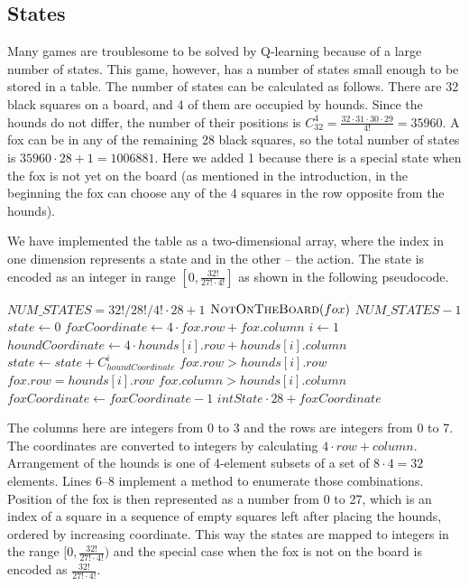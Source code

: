 \documentclass[a4paper]{article}
\begin{document}
\subsection{States} \label{states}
Many games are troublesome to be solved by Q-learning because of a large number
of states. This game, however, has a number of states small enough to be stored
in a table. The number of states can be calculated as follows. There are 32
black squares on a board, and 4 of them are occupied by hounds. Since the
hounds do not differ, the number of their positions is $C_{32}^4 = \frac{32
\cdot 31 \cdot 30 \cdot 29}{4!} = 35960$. A fox can be in any of the remaining
28 black squares, so the total number of states is $35960 \cdot 28 + 1 =
1006881$. Here we added 1 because there is a special state when the fox is not
yet on the board (as mentioned in the introduction, in the beginning the fox
can choose any of the 4 squares in the row opposite from the hounds).

We have implemented the table as a two-dimensional array, where the index in
one dimension represents a state and in the other -- the action. The state is
encoded as an integer in range $[0, \frac{32!}{27! \cdot 4!}]$ as shown in the
following pseudocode.

\begin{codebox}
    \li $NUM\_STATES = 32! / 28! / 4! \cdot 28 + 1$
    \li \If $\textnormal{\scshape NotOnTheBoard}(fox)$
    \li     \Then \Return $NUM\_STATES - 1$
        \End
    \li $state \gets 0$
    \li $foxCoordinate \gets 4 \cdot fox.row + fox.column$
    \li \For $i \gets 1$ 
    \li \Do $houndCoordinate \gets 4 \cdot hounds[i].row + hounds[i].column$
    \li     $state \gets state + C_{houndCoordinate}^i$
    \li     \If $fox.row > hounds[i].row$ 
    \li \>\> $fox.row = hounds[i].row$  $fox.column > hounds[i].column$
    \li         \Then $foxCoordinate \gets foxCoordinate - 1$
            \End
        \End
    \li \Return $intState \cdot 28 + foxCoordinate$
    \End
\end{codebox}

The columns here are integers from 0 to 3 and the rows are integers from 0 to 7.
The coordinates are converted to integers by calculating $4 \cdot row +
column$. Arrangement of the hounds is one of 4-element subsets of a set of $8
\cdot 4 = 32$ elements. Lines 6--8 implement a method to enumerate those %
combinations. Position of the fox is then represented as a number from 0 to 27,
which is an index of a square in a sequence of empty squares left after placing
the hounds, ordered by increasing coordinate. This way the states are mapped to
integers in the range $[0, \frac{32!}{27! \cdot 4!})$ and the special case when
the fox is not on the board is encoded as $\frac{32!}{27! \cdot 4!}$.
\end{document}
